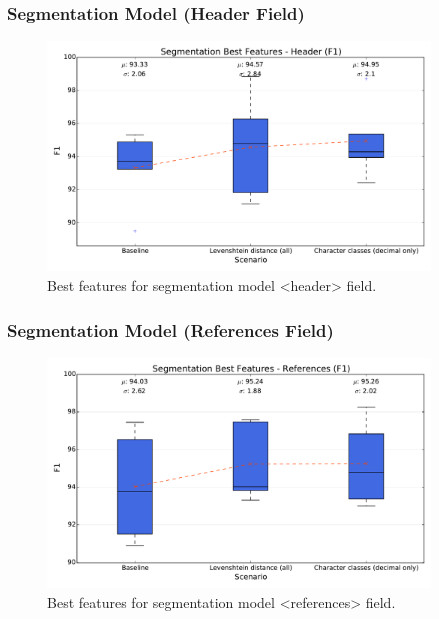 \documentclass{beamer}
\begin{document}

\begin{frame}
\frametitle{Segmentation Model (Header Field)}
\begin{figure}[h]
\center
\includegraphics[width=4in]{Figures/header.pdf}
\caption{Best features for segmentation model <header> field.}
\end{figure}
\end{frame}


\begin{frame}
\frametitle{Segmentation Model (References Field)}
\begin{figure}[h]
\center
\includegraphics[width=4in]{Figures/references.pdf}
\caption{Best features for segmentation model <references> field.}
\end{figure}
\end{frame}

\end{document}
